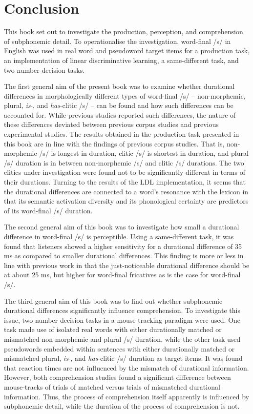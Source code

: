 \chapter{Conclusion}\label{chapter10}

This book set out to investigate the production, perception, and comprehension of subphonemic detail. To operationalise the investigation, word-final /s/ in English was used in real word and pseudoword target items for a production task, an implementation of linear discriminative learning, a same-different task, and two number-decision tasks.

The first general aim of the present book was to examine whether durational differences in morphologically different types of word-final /s/ – non-morphemic, plural, \textit{is}-, and \textit{has}-clitic /s/ – can be found and how such differences can be accounted for. While previous studies reported such differences, the nature of these differences deviated between previous corpus studies and previous experimental studies. The results obtained in the production task presented in this book are in line with the findings of previous corpus studies. That is, non-morphemic /s/ is longest in duration, clitic /s/ is shortest in duration, and plural /s/ duration is in between non-morphemic /s/ and clitic /s/ durations. The two clitics under investigation were found not to be significantly different in terms of their durations. Turning to the results of the LDL implementation, it seems that the durational differences are connected to a word’s resonance with the lexicon in that its semantic activation diversity and its phonological certainty are predictors of its word-final /s/ duration.

The second general aim of this book was to investigate how small a durational difference in word-final /s/ is perceptible. Using a same-different task, it was found that listeners showed a higher sensitivity for a durational difference of 35 ms as compared to smaller durational differences. This finding is more or less in line with previous work in that the just-noticeable durational difference should be at about 25 ms, but higher for word-final fricatives as is the case for word-final /s/.

The third general aim of this book was to find out whether subphonemic durational differences significantly influence comprehension. To investigate this issue, two number-decision tasks in a mouse-tracking paradigm were used. One task made use of isolated real words with either durationally matched or mismatched non-morphemic and plural /s/ duration, while the other task used pseudowords embedded within sentences with either durationally matched or mismatched plural, \textit{is}-, and \textit{has}-clitic /s/ duration as target items. It was found that reaction times are not influenced by the mismatch of durational information. However, both comprehension studies found a significant difference between mouse-tracks of trials of matched versus trials of mismatched durational information. Thus, the process of comprehension itself apparently is influenced by subphonemic detail, while the duration of the process of comprehension is not.


